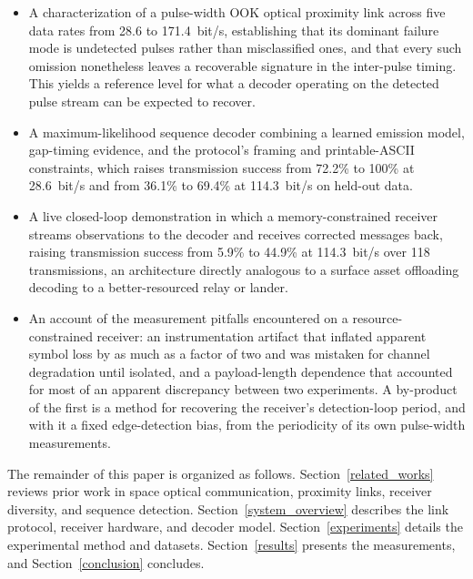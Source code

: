 \begin{itemize}
\item A characterization of a pulse-width OOK optical proximity link across
five data rates from 28.6 to 171.4~bit/s, establishing that its dominant
failure mode is undetected pulses rather than misclassified ones, and that
every such omission nonetheless leaves a recoverable signature in the
inter-pulse timing. This yields a reference level for what a decoder operating
on the detected pulse stream can be expected to recover.

\item A maximum-likelihood sequence decoder combining a learned emission model,
gap-timing evidence, and the protocol's framing and printable-ASCII
constraints, which raises transmission success from 72.2\% to 100\% at 28.6~bit/s and
from 36.1\% to 69.4\% at 114.3~bit/s on held-out data.

\item A live closed-loop demonstration in which a memory-constrained receiver
streams observations to the decoder and receives corrected messages back,
raising transmission success from 5.9\% to 44.9\% at 114.3~bit/s over 118
transmissions, an architecture directly analogous to a surface asset
offloading decoding to a better-resourced relay or lander.

\item An account of the measurement pitfalls encountered on a
resource-constrained receiver: an instrumentation artifact that inflated
apparent symbol loss by as much as a factor of two and was mistaken for channel
degradation until isolated, and a payload-length dependence that accounted for
most of an apparent discrepancy between two experiments. A by-product of the
first is a method for recovering the receiver's detection-loop period, and with
it a fixed edge-detection bias, from the periodicity of its own pulse-width
measurements.
\end{itemize}

The remainder of this paper is organized as follows.
Section~\ref{related_works} reviews prior work in space optical communication,
proximity links, receiver diversity, and sequence detection.
Section~\ref{system_overview} describes the link protocol, receiver hardware,
and decoder model. Section~\ref{experiments} details the experimental method
and datasets. Section~\ref{results} presents the measurements, and
Section~\ref{conclusion} concludes.
